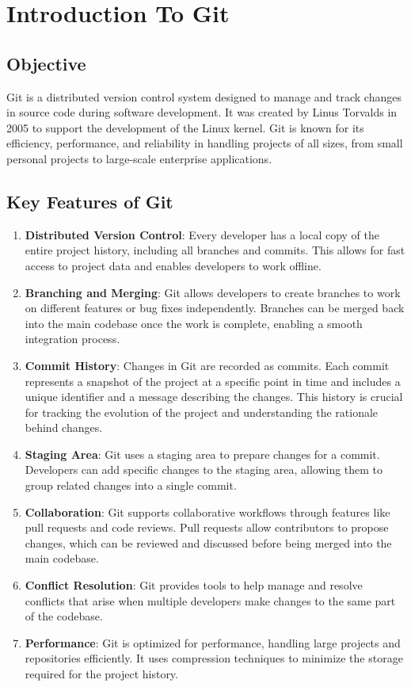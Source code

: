 \section{Introduction To Git}

\subsection{Objective}
Git is a distributed version control system designed to manage and track changes in source code during software development. It was created by Linus Torvalds in 2005 to support the development of the Linux kernel. Git is known for its efficiency, performance, and reliability in handling projects of all sizes, from small personal projects to large-scale enterprise applications.

\subsection{Key Features of Git}

\begin{enumerate}
    \item \textbf{Distributed Version Control}: Every developer has a local copy of the entire project history, including all branches and commits. This allows for fast access to project data and enables developers to work offline.
    \item \textbf{Branching and Merging}: Git allows developers to create branches to work on different features or bug fixes independently. Branches can be merged back into the main codebase once the work is complete, enabling a smooth integration process.
    \item \textbf{Commit History}: Changes in Git are recorded as commits. Each commit represents a snapshot of the project at a specific point in time and includes a unique identifier and a message describing the changes. This history is crucial for tracking the evolution of the project and understanding the rationale behind changes.
    \item \textbf{Staging Area}: Git uses a staging area to prepare changes for a commit. Developers can add specific changes to the staging area, allowing them to group related changes into a single commit.
    \item \textbf{Collaboration}: Git supports collaborative workflows through features like pull requests and code reviews. Pull requests allow contributors to propose changes, which can be reviewed and discussed before being merged into the main codebase.
    \item \textbf{Conflict Resolution}: Git provides tools to help manage and resolve conflicts that arise when multiple developers make changes to the same part of the codebase.
    \item \textbf{Performance}: Git is optimized for performance, handling large projects and repositories efficiently. It uses compression techniques to minimize the storage required for the project history.
\end{enumerate}

